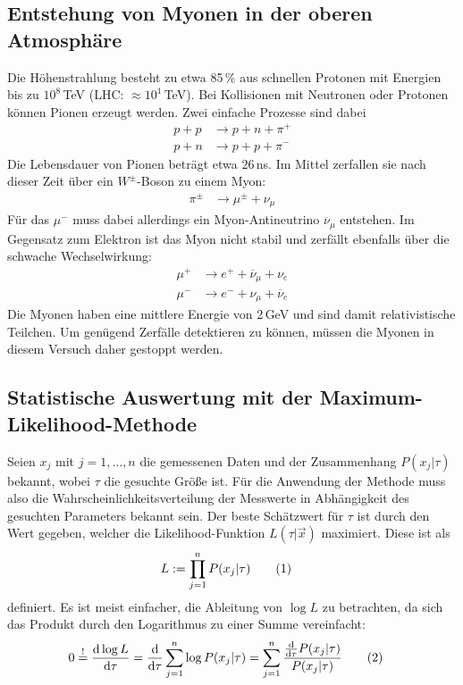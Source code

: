 \documentclass[german, parskip=full]{scrartcl}
\newcommand\numberthis{\addtocounter{equation}{1}\tag{\theequation}}
\newcommand{\tecxt}{}
\begin{document}
\subsection{Entstehung von Myonen in der oberen Atmosphäre}
Die Höhenstrahlung besteht zu etwa 85\,\% aus schnellen Protonen mit Energien bis zu $10^8\,$TeV (LHC: $\approx 10^1\,$TeV). Bei Kollisionen mit Neutronen oder Protonen können Pionen erzeugt werden. Zwei einfache Prozesse sind dabei
\begin{align*}
p+p&\longrightarrow p+n+\pi^+\\
p+n&\longrightarrow p+p+\pi^-
\end{align*}
Die Lebensdauer von Pionen beträgt etwa $26\,$ns. Im Mittel zerfallen sie nach dieser Zeit über ein $W^\pm$-Boson zu einem Myon:
\begin{align*}
\pi^\pm &\longrightarrow\mu^\pm +\nu_\mu
\end{align*}
Für das $\mu^-$ muss dabei allerdings ein Myon-Antineutrino $\overline{\nu}_\mu$ entstehen. Im Gegensatz zum Elektron ist das Myon nicht stabil und zerfällt ebenfalls über die schwache Wechselwirkung:
\begin{align*}
\mu^+ &\longrightarrow e^+ +\overline{\nu}_\mu +\nu_e\\
\mu^- &\longrightarrow e^- +\nu_\mu+\overline{\nu}_e 
\end{align*}
Die Myonen haben eine mittlere Energie von 2\,GeV und sind damit relativistische Teilchen. Um genügend Zerfälle detektieren zu können, müssen die Myonen in diesem Versuch daher gestoppt werden.
\subsection{Statistische Auswertung mit der Maximum-Likelihood-Methode}
Seien $x_j$ mit $j=1,\dots,n$ die gemessenen Daten und der Zusammenhang $P(x_j|\tau)$ bekannt, wobei $\tau$ die gesuchte Größe ist. Für die Anwendung der Methode muss also die Wahrscheinlichkeitsverteilung der Messwerte in Abhängigkeit des gesuchten Parameters bekannt sein. Der beste Schätzwert für $\tau$ ist durch den Wert gegeben, welcher die Likelihood-Funktion $L(\tau|\vec{x})$ maximiert. Diese ist als
\begin{align*}
L&:=\prod_{j=1}^nP(x_j|\tau)\numberthis\label{eqn:L von tau Definition}
\end{align*}
definiert. Es ist meist einfacher, die Ableitung von $\log L$ zu betrachten, da sich das Produkt durch den Logarithmus zu einer Summe vereinfacht:
\begin{align*}
0&\overset{!}{=}\frac{\tecxt\text{d}\log L}{\tecxt\text{d}\tau}=\frac{\tecxt\text{d}}{\tecxt\text{d}\tau}\sum_{j=1}^n\log P(x_j|\tau)=\sum_{j=1}^n\frac{\frac{\tecxt\text{d}}{\tecxt\text{d}\tau}P(x_j|\tau)}{P(x_j|\tau)}\numberthis\label{eqn:dlog L dtau gleich 0}
\end{align*}
\end{document}

